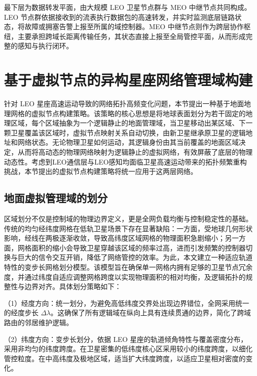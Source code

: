\documentclass[print, master, vlined]{DissertUESTC}
\begin{document}
    最下层为数据转发平面，由大规模 LEO 卫星节点群与 MEO 中继节点共同构成。LEO 节点群依据接收到的流表执行数据包的高速转发，并实时监测底层链路状态，将故障或拥塞告警上报至所属的域控制器。MEO 中继节点则作为跨层协作枢纽，主要承担跨域长距离传输任务，其状态直接上报至全局管控平面，从而形成完整的感知与执行闭环。
    

    \section{基于虚拟节点的异构星座网络管理域构建}
    \label{sec: 区域构建}
    针对 LEO 星座高速运动导致的网络拓扑高频变化问题，本节提出一种基于地面地理网格的虚拟节点构建策略。该策略的核心思想是将地球表面划分为若干固定的地理区域，每个区域抽象为一个逻辑静止的地面管理域，当卫星移动出某区域、下一颗卫星覆盖该区域时，虚拟节点映射关系自动切换，由新卫星继承原卫星的逻辑地址和网络状态。无论物理卫星如何运动，其逻辑身份由其当前覆盖的地面区域决定，从而将高动态的物理网络映射为逻辑静止的虚拟网络，有效屏蔽了底层的物理动态性。考虑到LEO通信层与LEO感知均面临卫星高速运动带来的拓扑频繁重构挑战，本节提出的虚拟节点构建策略将统一应用于这两层网络。
    
    \subsection{地面虚拟管理域的划分} %
    \label{sec: 地面虚拟管理域的划分}
    区域划分不仅是控制域的物理边界定义，更是全网负载均衡与控制稳定性的基础。传统的均匀经纬度网格在低轨卫星场景下存在显著缺陷：一方面，受地球几何形状影响，经线在两极逐渐收敛，导致高纬度区域网格的物理面积急剧缩小；另一方面，网格面积的缩小会导致卫星穿越该区域的频率过高，进而引发频繁的控制器切换与巨大的信令交互开销，降低了网络管控的效率。为此，本文建立一种适应轨道特性的变步长网格划分模型。该模型旨在确保单一网格内拥有足够的卫星节点冗余度，并通过纬度自适应调整网格跨度以实现物理面积的相对均衡，及逻辑拓扑的规整性与边界对齐。具体划分策略如下：

    （1）经度方向：统一划分，为避免高低纬度交界处出现边界错位，全网采用统一的经度步长 $\Delta \lambda$。这确保了所有逻辑域在纵向上具有连续贯通的边界，简化了跨域路由的邻居维护逻辑。
  
    （2）纬度方向：变步长划分，依据 LEO 星座的轨道倾角特性与覆盖密度分布，采用非均匀的纬度跨度。在卫星密集的低纬度核心区采用较小的纬度跨度，以细化管控粒度。在中高纬度及极地区域，适当扩大纬度跨度，以适应卫星相对密度的变化。
    
\end{document}
